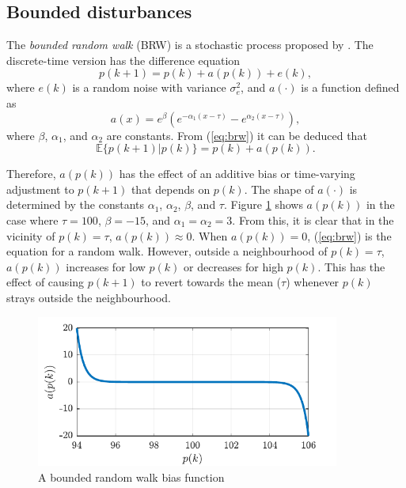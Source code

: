 \subsection{Bounded disturbances} \label{sec:bounded}

The \textit{bounded random walk} (\gls{BRW}) is a stochastic process proposed by \cite{nicolau_stationary_2002}. The discrete-time version has the difference equation
\begin{equation} \label{eq:brw}
		p(k+1) = p(k) + a(p(k)) + e(k),
\end{equation}
where $e(k)$ is a random noise with variance $\sigma_e^2$, and $a(\cdot)$ is a function defined as
\begin{equation}
	a(x) = e^{\beta}\left(e^{-\alpha_{1}\left(x - \tau\right)} - e^{\alpha_{2}\left(x - \tau\right)}\right),
\end{equation}
where $\beta$, $\alpha_{1}$, and $\alpha_{2}$ are constants.  From (\ref{eq:brw}) it can be deduced that
\begin{equation}
	\mathbb{E}\{p(k+1)|p(k)\} = p(k) + a(p(k)).
\end{equation}

Therefore, $a(p(k))$ has the effect of an additive bias or time-varying adjustment to $p(k+1)$ that depends on $p(k)$. The shape of $a(\cdot)$ is determined by the constants $\alpha_{1}$,  $\alpha_{2}$, $\beta$, and $\tau$. Figure \ref{fig:brw-a} shows $a(p(k))$ in the case where $\tau=100$, $\beta=-15$, and $\alpha_{1}=\alpha_{2}=3$.  From this, it is clear that in the vicinity of $p(k)=\tau$, $a(p(k))\approx0$. When $a(p(k))=0$, (\ref{eq:brw}) is the equation for a random walk. However, outside a neighbourhood of $p(k)=\tau$, $a(p(k))$ increases for low $p(k)$ or decreases for high $p(k)$. This has the effect of causing $p(k+1)$ to revert towards the mean ($\tau$) whenever $p(k)$ strays outside the neighbourhood. 

\begin{figure}[ht]
	\centering
	\includegraphics[height=5cm]{images/brw_a.pdf}
	\caption{A bounded random walk bias function}
	\label{fig:brw-a}
\end{figure}

